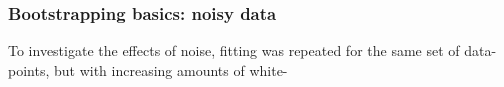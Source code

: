 \subsubsection{Bootstrapping basics: noisy data}

To investigate the effects of noise, fitting was repeated for the same set of data-points, but with increasing amounts of white-